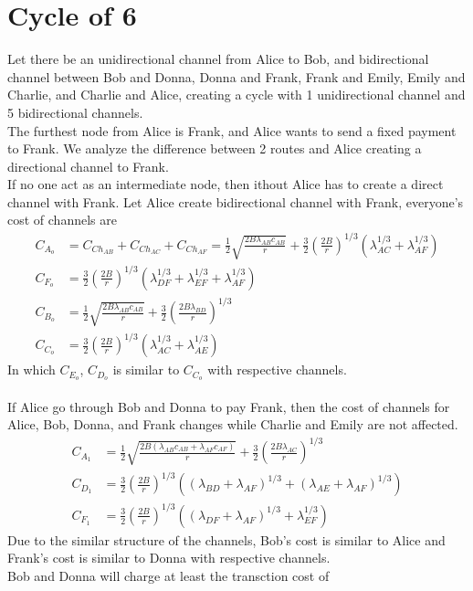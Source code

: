 \documentclass[12pt]{article}
\theoremstyle{plain}
\theoremstyle{remark}
\theoremstyle{definition}
\begin{document}
\section{Cycle of 6}
Let there be an unidirectional channel from Alice to Bob, and bidirectional channel between Bob and Donna, Donna and Frank, Frank and Emily, Emily and Charlie, and Charlie and Alice, creating a cycle with 1 unidirectional channel and 5 bidirectional channels. 
\\ The furthest node from Alice is Frank, and Alice wants to send a fixed payment to Frank. We analyze the difference between 2 routes and Alice creating a directional channel to Frank. 
\\ If no one act as an intermediate node, then ithout Alice has to create a direct channel with Frank. Let Alice create bidirectional channel with Frank, everyone's cost of channels are 
\begin{align}
  C_{A_o} &= C_{Ch_{AB}} + C_{Ch_{AC}} + C_{Ch_{AF}} = \frac{1}{2}\sqrt{\frac{2B\lambda_{AB} c_{AB}}{r}}+\frac{3}{2}(\frac{2B}{r})^{1/3}(\lambda_{AC}^{1/3}+\lambda_{AF}^{1/3})\\
  C_{F_o} &= \frac{3}{2}(\frac{2B}{r})^{1/3}(\lambda_{DF}^{1/3}+\lambda_{EF}^{1/3}+\lambda_{AF}^{1/3})\\
  C_{B_o} &= \frac{1}{2}\sqrt{\frac{2B\lambda_{AB} c_{AB}}{r}} + \frac{3}{2}(\frac{2B\lambda_{BD}}{r})^{1/3}\\
  C_{C_o} &=  \frac{3}{2}(\frac{2B}{r})^{1/3}(\lambda_{AC}^{1/3}+\lambda_{AE}^{1/3})
\end{align}
In which $C_{E_o}$, $C_{D_o}$ is similar to $C_{C_o}$ with respective channels. \\
\\ If Alice go through Bob and Donna to pay Frank, then the cost of channels for Alice, Bob, Donna, and Frank changes while Charlie and Emily are not affected.
\begin{align}
  C_{A_1} &= \frac{1}{2}\sqrt{\frac{2B(\lambda_{AB} c_{AB}+\lambda_{AF}c_{AF})}{r}} + \frac{3}{2}(\frac{2B\lambda_{AC}}{r})^{1/3}\\
  C_{D_1} &=  \frac{3}{2}(\frac{2B}{r})^{1/3}((\lambda_{BD}+\lambda_{AF})^{1/3}+(\lambda_{AE}+\lambda_{AF})^{1/3})\\
  C_{F_1} &=  \frac{3}{2}(\frac{2B}{r})^{1/3}((\lambda_{DF}+\lambda_{AF})^{1/3}+\lambda_{EF}^{1/3})
\end{align}
Due to the similar structure of the channels, Bob's cost is similar to Alice and Frank's cost is similar to Donna with respective channels.
\\ Bob and Donna will charge at least the transction cost of
\end{document}
